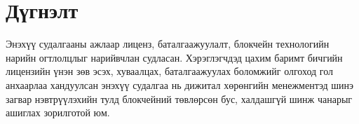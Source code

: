\chapter{Дүгнэлт}
Энэхүү судалгааны ажлаар лиценз, баталгаажуулалт, блокчейн технологийн нарийн огтлолцлыг нарийвчлан судласан. Хэрэглэгчдэд цахим баримт бичгийн лицензийн үнэн зөв эсэх, хуваалцах, баталгаажуулах боломжийг олгоход гол анхаарлаа хандуулсан энэхүү судалгаа нь дижитал хөрөнгийн менежментэд шинэ загвар нэвтрүүлэхийн тулд блокчейний төвлөрсөн бус, халдашгүй шинж чанарыг ашиглах зорилготой юм.